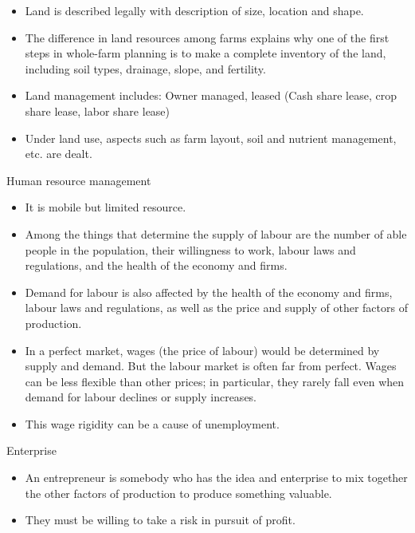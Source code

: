 \documentclass[12pt,ignorenonframetext,aspectratio=169]{beamer}
\providecommand{\tightlist}{%
  \setlength{\itemsep}{0pt}\setlength{\parskip}{0pt}}
\begin{document}
\begin{frame}{}
\protect\hypertarget{section-4}{}
\begin{itemize}
\tightlist
\item
  Land is described legally with description of size, location and
  shape.
\item
  The difference in land resources among farms explains why one of the
  first steps in whole-farm planning is to make a complete inventory of
  the land, including soil types, drainage, slope, and fertility.
\item
  Land management includes: Owner managed, leased (Cash share lease,
  crop share lease, labor share lease)
\item
  Under land use, aspects such as farm layout, soil and nutrient
  management, etc. are dealt.
\end{itemize}
\end{frame}

\begin{frame}{Human resource management}
\protect\hypertarget{human-resource-management}{}
\begin{itemize}
\tightlist
\item
  It is mobile but limited resource.
\item
  Among the things that determine the supply of labour are the number of
  able people in the population, their willingness to work, labour laws
  and regulations, and the health of the economy and firms.
\item
  Demand for labour is also affected by the health of the economy and
  firms, labour laws and regulations, as well as the price and supply of
  other factors of production.
\item
  In a perfect market, wages (the price of labour) would be determined
  by supply and demand. But the labour market is often far from perfect.
  Wages can be less flexible than other prices; in particular, they
  rarely fall even when demand for labour declines or supply increases.
\item
  This wage rigidity can be a cause of unemployment.
\end{itemize}
\end{frame}

\begin{frame}{Enterprise}
\protect\hypertarget{enterprise}{}
\begin{itemize}
\tightlist
\item
  An entrepreneur is somebody who has the idea and enterprise to mix
  together the other factors of production to produce something
  valuable.
\item
  They must be willing to take a risk in pursuit of profit.
\end{itemize}
\end{frame}
\end{document}
